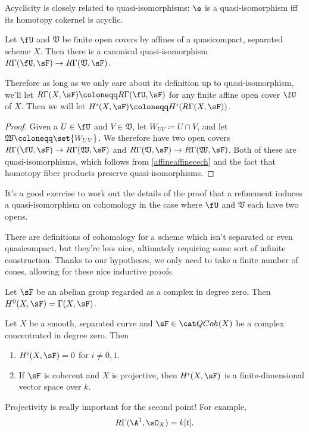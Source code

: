 Acyclicity is closely related to quasi-isomorphisms: $\e$ is a quasi-isomorphism iff its homotopy cokernel is acyclic.
\begin{cor}
Let $\fU$ and $\mathfrak V$ be finite open covers by affines of a quasicompact, separated scheme $X$. Then there is a canonical quasi-isomorphism $R\Gamma(\fU, \sF)\to R\Gamma(\mathfrak V, \sF)$.
\end{cor}
Therefore as long as we only care about its definition up to quasi-isomorphism, we'll let $R\Gamma(X,\sF)\coloneqq R\Gamma(\fU,\sF)$ for any finite affine open cover $\fU$ of $X$. Then we will let $H^i(X,\sF)\coloneqq H^i(R\Gamma(X,\sF))$.
\begin{proof}
Given a $U\in\fU$ and $V\in\mathfrak V$, let $W_{UV} \coloneqq U\cap V$, and let $\mathfrak W\coloneqq\set{W_{UV}}$. We therefore have two open covers $R\Gamma(\fU,\sF)\to R\Gamma(\mathfrak W,\sF)$ and $R\Gamma(\mathfrak V,\sF)\to R\Gamma(\mathfrak W,\sF)$. Both of these are quasi-isomorphisms, which follows from \cref{affineaffinecech} and the fact that homotopy fiber products preserve quasi-isomorphisms.
\end{proof}
It's a good exercise to work out the details of the proof that a refinement induces a quasi-isomorphism on cohomology in the case where $\fU$ and $\mathfrak V$ each have two opens.
\begin{rem}
There are definitions of cohomology for a scheme which isn't separated or even quasicompact, but they're less nice, ultimately requiring some sort of infinite construction. Thanks to our hypotheses, we only need to take a finite number of cones, allowing for these nice inductive proofs.
\end{rem}
\begin{exm}
Let $\sF$ be an abelian group regarded as a complex in degree zero. Then $H^0(X,\sF) = \Gamma(X,\sF)$.
\end{exm}
\begin{thm}
Let $X$ be a smooth, separated curve and $\sF\in\QCoh(X)$ be a complex concentrated in degree zero. Then
\begin{enumerate}
    \item $H^i(X,\sF) = 0$ for $i\ne 0,1$.
    \item If $\sF$ is coherent and $X$ is projective, then $H^i(X,\sF)$ is a finite-dimensional vector space over $k$.
\end{enumerate}
\end{thm}
Projectivity is really important for the second point! For example,
\begin{equation}
    R\Gamma(\A^1, \sO_X) = k[t].
\end{equation}
